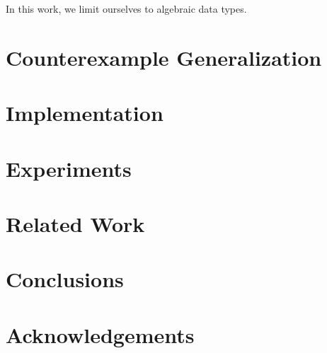 \documentclass[10pt]{sigplanconf}
\begin{document}

In this work, we limit ourselves to algebraic data types.


\section{Counterexample Generalization}


\section{Implementation}



\section{Experiments}



\section{Related Work}
\label{sec:related}


\cite{}

\section{Conclusions}
\label{sec:conclusions}


\section*{Acknowledgements}




\end{document}
